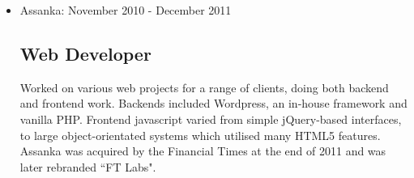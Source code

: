 \documentclass[a4paper]{article}
\newenvironment{detail}{\begin{adjustwidth}{10pt}{}}{\end{adjustwidth}}
\begin{document}
\begin{itemize}
\item Assanka: November 2010 - December 2011
\subsection*{Web Developer}
\begin{detail}
Worked on various web projects for a range of clients, doing both backend and frontend work. Backends included Wordpress, an in-house framework and vanilla PHP. Frontend javascript varied from simple jQuery-based interfaces, to large object-orientated systems which utilised many HTML5 features.
Assanka was acquired by the Financial Times at the end of 2011 and was later rebranded ``FT Labs".
\end{detail}

\end{itemize}
\end{document}
